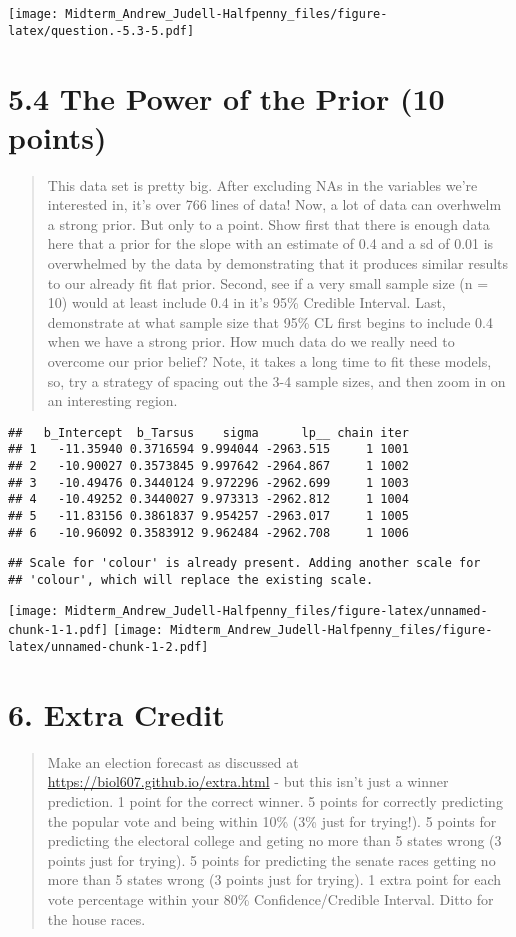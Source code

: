 \documentclass[]{article}
\begin{document}
\texttt{[image: Midterm\_Andrew\_Judell-Halfpenny\_files/figure-latex/question.-5.3-5.pdf]}

\section{5.4 The Power of the Prior (10
points)}\label{the-power-of-the-prior-10-points}

\begin{quote}
This data set is pretty big. After excluding NAs in the variables we're
interested in, it's over 766 lines of data! Now, a lot of data can
overhwelm a strong prior. But only to a point. Show first that there is
enough data here that a prior for the slope with an estimate of 0.4 and
a sd of 0.01 is overwhelmed by the data by demonstrating that it
produces similar results to our already fit flat prior. Second, see if a
very small sample size (n = 10) would at least include 0.4 in it's 95\%
Credible Interval. Last, demonstrate at what sample size that 95\% CL
first begins to include 0.4 when we have a strong prior. How much data
do we really need to overcome our prior belief? Note, it takes a long
time to fit these models, so, try a strategy of spacing out the 3-4
sample sizes, and then zoom in on an interesting region.
\end{quote}

\begin{verbatim}
##   b_Intercept  b_Tarsus    sigma      lp__ chain iter
## 1   -11.35940 0.3716594 9.994044 -2963.515     1 1001
## 2   -10.90027 0.3573845 9.997642 -2964.867     1 1002
## 3   -10.49476 0.3440124 9.972296 -2962.699     1 1003
## 4   -10.49252 0.3440027 9.973313 -2962.812     1 1004
## 5   -11.83156 0.3861837 9.954257 -2963.017     1 1005
## 6   -10.96092 0.3583912 9.962484 -2962.708     1 1006
\end{verbatim}

\begin{verbatim}
## Scale for 'colour' is already present. Adding another scale for
## 'colour', which will replace the existing scale.
\end{verbatim}

\texttt{[image: Midterm\_Andrew\_Judell-Halfpenny\_files/figure-latex/unnamed-chunk-1-1.pdf]}
\texttt{[image: Midterm\_Andrew\_Judell-Halfpenny\_files/figure-latex/unnamed-chunk-1-2.pdf]}

\section{6. Extra Credit}\label{extra-credit}

\begin{quote}
Make an election forecast as discussed at
\url{https://biol607.github.io/extra.html} - but this isn't just a
winner prediction. 1 point for the correct winner. 5 points for
correctly predicting the popular vote and being within 10\% (3\% just
for trying!). 5 points for predicting the electoral college and geting
no more than 5 states wrong (3 points just for trying). 5 points for
predicting the senate races getting no more than 5 states wrong (3
points just for trying). 1 extra point for each vote percentage within
your 80\% Confidence/Credible Interval. Ditto for the house races.
\end{quote}
\end{document}
